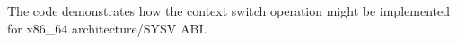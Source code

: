 \label{appendix}
The code demonstrates how the context switch operation might be implemented for
x86\_64 architecture/SYSV ABI.
